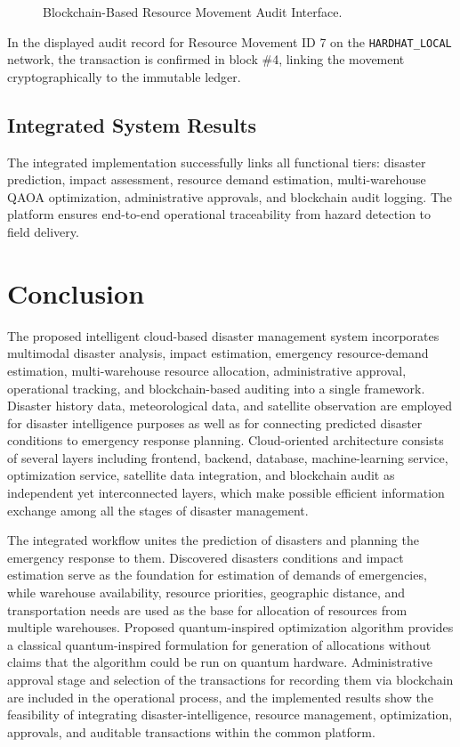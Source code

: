 \documentclass[conference]{IEEEtran}
\begin{document}
\begin{figure}[htbp]
\centering
\fbox{\rule{0pt}{1.8in} \rule{0.9\linewidth}{0pt}}
\caption{Blockchain-Based Resource Movement Audit Interface.}
\label{fig:blockchain_audit}
\end{figure}

In the displayed audit record for Resource Movement ID 7 on the \texttt{HARDHAT\_LOCAL} network, the transaction is confirmed in block \#4, linking the movement cryptographically to the immutable ledger.

\subsection{Integrated System Results}
The integrated implementation successfully links all functional tiers: disaster prediction, impact assessment, resource demand estimation, multi-warehouse QAOA optimization, administrative approvals, and blockchain audit logging. The platform ensures end-to-end operational traceability from hazard detection to field delivery.

\section{Conclusion}
The proposed intelligent cloud-based disaster management system incorporates multimodal disaster analysis, impact estimation, emergency resource-demand estimation, multi-warehouse resource allocation, administrative approval, operational tracking, and blockchain-based auditing into a single framework. Disaster history data, meteorological data, and satellite observation are employed for disaster intelligence purposes as well as for connecting predicted disaster conditions to emergency response planning. Cloud-oriented architecture consists of several layers including frontend, backend, database, machine-learning service, optimization service, satellite data integration, and blockchain audit as independent yet interconnected layers, which make possible efficient information exchange among all the stages of disaster management.

The integrated workflow unites the prediction of disasters and planning the emergency response to them. Discovered disasters conditions and impact estimation serve as the foundation for estimation of demands of emergencies, while warehouse availability, resource priorities, geographic distance, and transportation needs are used as the base for allocation of resources from multiple warehouses. Proposed quantum-inspired optimization algorithm provides a classical quantum-inspired formulation for generation of allocations without claims that the algorithm could be run on quantum hardware. Administrative approval stage and selection of the transactions for recording them via blockchain are included in the operational process, and the implemented results show the feasibility of integrating disaster-intelligence, resource management, optimization, approvals, and auditable transactions within the common platform.
\end{document}
